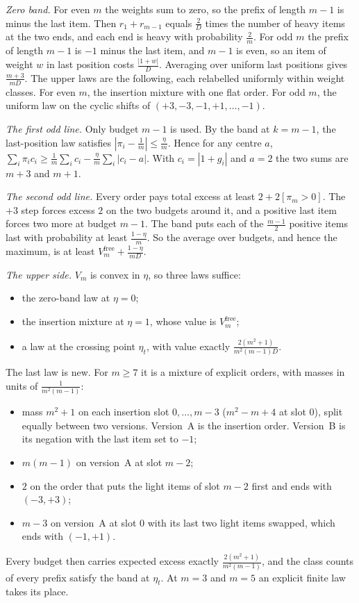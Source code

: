 \emph{Zero band.} For even $m$ the weights sum to zero, so the prefix of length $m-1$ is minus
the last item. Then $r_{1}+r_{m-1}$ equals $\frac{2}{D}$ times the number of heavy items at
the two ends, and each end is heavy with probability $\frac{2}{m}$. For odd $m$ the prefix
of length $m-1$ is $-1$ minus the last item, and $m-1$ is even, so an item of weight $w$ in
last position costs $\frac{|1+w|}{D}$. Averaging over uniform last positions gives
$\frac{m+3}{mD}$. The upper laws are the following, each relabelled uniformly within weight
classes. For even $m$, the insertion mixture with one flat order. For odd $m$, the uniform
law on the cyclic shifts of $(+3,-3,-1,+1,\dots,-1)$.

\emph{The first odd line.} Only budget $m-1$ is used. By the band at $k=m-1$, the
last-position law satisfies $|\pi_{i}-\frac1m|\le\frac{\eta}{m}$. Hence for any centre $a$,
$\sum_{i}\pi_{i}c_{i}\ge\frac1m\sum_{i}c_{i}-\frac{\eta}{m}\sum_{i}|c_{i}-a|$. With
$c_{i}=|1+g_{i}|$ and $a=2$ the two sums are $m+3$ and $m+1$.

\emph{The second odd line.} Every order pays total excess at least $2+2[\pi_{m}>0]$. The
$+3$ step forces excess $2$ on the two budgets around it, and a positive last item forces two
more at budget $m-1$. The band puts each of the $\frac{m-1}{2}$ positive items last with
probability at least $\frac{1-\eta}{m}$. So the average over budgets, and hence the maximum,
is at least $V^{\mathrm{free}}_{m}+\frac{1-\eta}{mD}$.

\emph{The upper side.} $V_{m}$ is convex in $\eta$, so three laws suffice:
\begin{itemize}
\item the zero-band law at $\eta=0$;
\item the insertion mixture at $\eta=1$, whose value is $V^{\mathrm{free}}_{m}$;
\item a law at the crossing point $\eta_{t}$, with value exactly
$\frac{2(m^{2}+1)}{m^{2}(m-1)D}$.
\end{itemize}
The last law is new. For $m\ge7$ it is a mixture of explicit orders, with masses in units of
$\frac{1}{m^{2}(m-1)}$:
\begin{itemize}
\item mass $m^{2}+1$ on each insertion slot $0,\dots,m-3$ ($m^{2}-m+4$ at slot $0$), split
equally between two versions. Version~A is the insertion order. Version~B is its negation
with the last item set to $-1$;
\item $m(m-1)$ on version~A at slot $m-2$;
\item $2$ on the order that puts the light items of slot $m-2$ first and ends with
$(-3,+3)$;
\item $m-3$ on version~A at slot $0$ with its last two light items swapped, which ends with
$(-1,+1)$.
\end{itemize}
Every budget then carries expected excess exactly $\frac{2(m^{2}+1)}{m^{2}(m-1)}$, and the
class counts of every prefix satisfy the band at $\eta_{t}$. At $m=3$ and $m=5$ an explicit
finite law takes its place.

